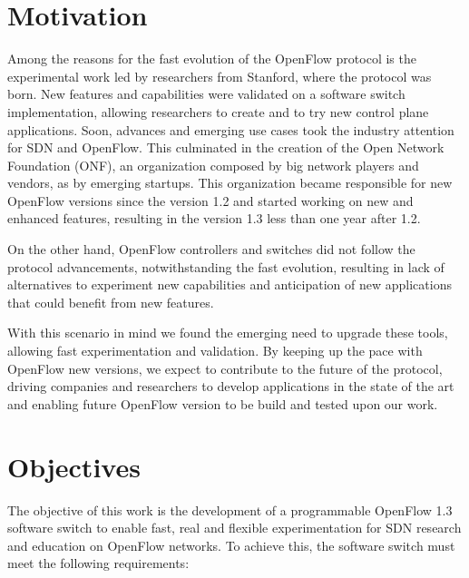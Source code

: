\section{Motivation}
\label{sec:sec01}

Among the reasons for the fast evolution of the OpenFlow protocol is the experimental work led by researchers from Stanford, where the protocol was born. New features and capabilities were validated on a software switch implementation, allowing researchers to create and to try new control plane applications. Soon, advances and emerging use cases took the industry attention for SDN and OpenFlow. This culminated in the creation of the Open Network Foundation (ONF), an organization composed by big network players and vendors, as by emerging startups. This organization became responsible for new OpenFlow versions since the version 1.2 and started working on new and enhanced features, resulting in the version 1.3 less than one year after 1.2. 

On the other hand, OpenFlow controllers and switches did not follow the protocol advancements, notwithstanding the fast evolution, resulting in lack of alternatives to experiment new capabilities and anticipation of new applications that could benefit from new features.

With this scenario in mind we found the emerging need to upgrade these tools, allowing fast experimentation and validation. By keeping up the pace with OpenFlow new versions, we expect to contribute to the future of the protocol, driving companies and researchers to develop applications in the state of the art and  enabling future OpenFlow version to be build and tested upon our work.  

\section{Objectives}
\label{sec:sec02}

The objective of this work is the development of a programmable OpenFlow 1.3 software switch to enable fast, real and flexible experimentation for SDN research and education on OpenFlow networks. To achieve this, the software switch must meet the following requirements:  

